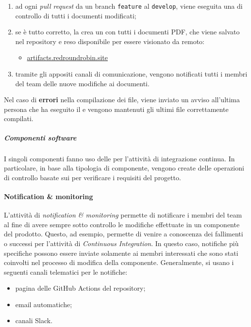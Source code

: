 		\begin{enumerate}
			\item ad ogni \textit{pull request} da un branch \verb!feature! al \verb!develop!, viene eseguita una  di controllo di tutti i documenti modificati;
			\item se è tutto corretto, la  crea un  con tutti i documenti PDF, che viene salvato nel repository e reso disponibile per essere visionato da remoto:
			\begin{itemize}
				\item \href{https://artifacts.redroundrobin.site}{artifacts.redroundrobin.site}
			\end{itemize}
			\item tramite gli appositi canali di comunicazione, vengono notificati tutti i membri del team delle nuove modifiche ai documenti.
		\end{enumerate}

		Nel caso di \textbf{errori} nella compilazione dei file, viene inviato un avviso all'ultima persona che ha eseguito il  e vengono mantenuti gli ultimi file correttamente compilati.

		\subparagraph{Componenti software}

		I singoli componenti fanno uso delle  per l'attività di integrazione continua. In particolare, in base alla tipologia di componente, vengono create delle operazioni di controllo basate sui  per verificare i requisiti del progetto.
	

	\paragraph{Notification \& monitoring}

	L'attività di \textit{notification \& monitoring} permette di notificare i membri del team al fine di avere sempre sotto controllo le modifiche effettuate in un componente del prodotto. Questo, ad esempio, permette di venire a conoscenza dei fallimenti o successi per l'attività di \textit{Continuous Integration}. In questo caso, notifiche più specifiche possono essere inviate solamente ai membri interessati che sono stati coinvolti nel processo di modifica della componente. 
	\newline
	Generalmente, si usano i seguenti canali telematici per le notifiche:
	\begin{itemize}
		\item pagina delle GitHub Actions del repository;
		\item email automatiche;
		\item canali Slack.
	\end{itemize}

